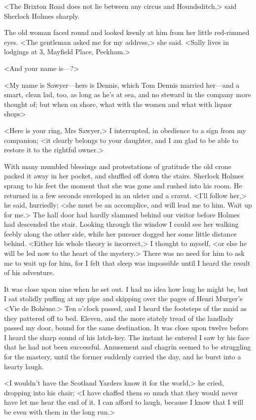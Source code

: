 <The Brixton Road does not lie between any circus and Houndsditch,> said Sherlock Holmes sharply.

The old woman faced round and looked keenly at him from her little red-rimmed eyes. <The gentleman asked me for my address,> she said. <Sally lives in lodgings at 3, Mayfield Place, Peckham.>

<And your name is—?>

<My name is Sawyer—hers is Dennis, which Tom Dennis married her—and a smart, clean lad, too, as long as he's at sea, and no steward in the company more thought of; but when on shore, what with the women and what with liquor shops\longdash>

<Here is your ring, Mrs Sawyer,> I interrupted, in obedience to a sign from my companion; <it clearly belongs to your daughter, and I am glad to be able to restore it to the rightful owner.>

With many mumbled blessings and protestations of gratitude the old crone packed it away in her pocket, and shuffled off down the stairs. Sherlock Holmes sprang to his feet the moment that she was gone and rushed into his room. He returned in a few seconds enveloped in an ulster and a cravat. <I'll follow her,> he said, hurriedly; <she must be an accomplice, and will lead me to him. Wait up for me.> The hall door had hardly slammed behind our visitor before Holmes had descended the stair. Looking through the window I could see her walking feebly along the other side, while her pursuer dogged her some little distance behind. <Either his whole theory is incorrect,> I thought to myself, <or else he will be led now to the heart of the mystery.> There was no need for him to ask me to wait up for him, for I felt that sleep was impossible until I heard the result of his adventure.

It was close upon nine when he set out. I had no idea how long he might be, but I sat stolidly puffing at my pipe and skipping over the pages of Henri Murger's <Vie de Bohème.> Ten o'clock passed, and I heard the footsteps of the maid as they pattered off to bed. Eleven, and the more stately tread of the landlady passed my door, bound for the same destination. It was close upon twelve before I heard the sharp sound of his latch-key. The instant he entered I saw by his face that he had not been successful. Amusement and chagrin seemed to be struggling for the mastery, until the former suddenly carried the day, and he burst into a hearty laugh.

<I wouldn't have the Scotland Yarders know it for the world,> he cried, dropping into his chair; <I have chaffed them so much that they would never have let me hear the end of it. I can afford to laugh, because I know that I will be even with them in the long run.>

